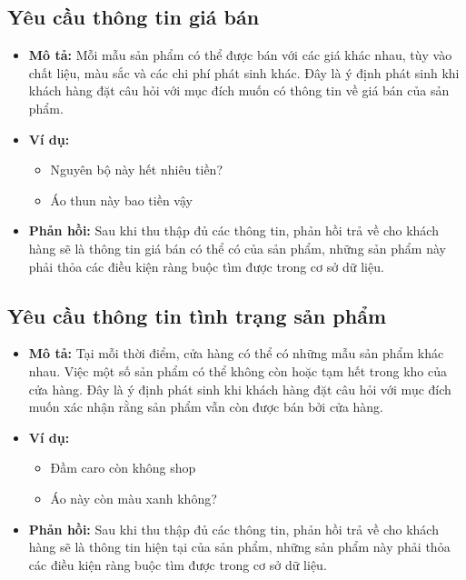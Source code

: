 \subsection{Yêu cầu thông tin giá bán}
\begin{itemize}
    \item \textbf{Mô tả:} Mỗi mẫu sản phẩm có thể được bán với các
    giá khác nhau, tùy vào chất liệu, màu sắc và các chi phí
    phát sinh khác. Đây là ý định phát sinh khi khách hàng đặt
    câu hỏi với mục đích muốn có thông tin về giá bán của sản phẩm.
    \item \textbf{Ví dụ:}
    \begin{itemize}
        \item Nguyên bộ này hết nhiêu tiền?
        \item Áo thun này bao tiền vậy
    \end{itemize}
    \item \textbf{Phản hồi:} Sau khi thu thập đủ các thông tin,
    phản hồi trả về cho khách hàng sẽ là thông tin giá bán có thể có
    của sản phẩm, những sản phẩm này phải thỏa các điều kiện
    ràng buộc tìm được trong cơ sở dữ liệu.
\end{itemize}

\subsection{Yêu cầu thông tin tình trạng sản phẩm}
\begin{itemize}
    \item \textbf{Mô tả:} Tại mỗi thời điểm, cửa hàng có thể có những
    mẫu sản phẩm khác nhau. Việc một số sản phẩm có thể không còn
    hoặc tạm hết trong kho của cửa hàng. Đây là ý định phát sinh khi
    khách hàng đặt câu hỏi với mục đích muốn xác nhận rằng sản phẩm
    vẫn còn được bán bởi cửa hàng.
    \item \textbf{Ví dụ:}
    \begin{itemize}
        \item Đầm caro còn không shop
        \item Áo này còn màu xanh không?
    \end{itemize}
    \item \textbf{Phản hồi:} Sau khi thu thập đủ các thông tin,
    phản hồi trả về cho khách hàng sẽ là thông tin hiện tại của
    sản phẩm, những sản phẩm này phải thỏa các điều kiện ràng buộc
    tìm được trong cơ sở dữ liệu.
\end{itemize}

